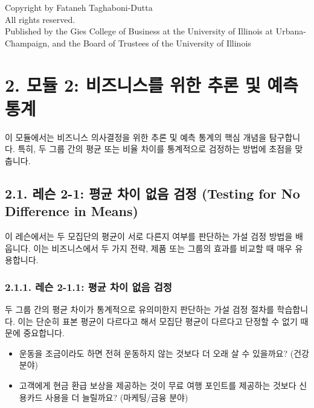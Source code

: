 \documentclass[11pt,a4paper]{article}
\begin{document}
\begin{tcolorbox}[mybox, title=저작권 정보]
Copyright  by Fataneh Taghaboni-Dutta \\
All rights reserved. \\
Published by the Gies College of Business at the University of Illinois at Urbana-Champaign, and the Board of Trustees of the University of Illinois
\end{tcolorbox}

\newpage
\section*{2. 모듈 2: 비즈니스를 위한 추론 및 예측 통계}

이 모듈에서는 비즈니스 의사결정을 위한 추론 및 예측 통계의 핵심 개념을 탐구합니다. 특히, 두 그룹 간의 평균 또는 비율 차이를 통계적으로 검정하는 방법에 초점을 맞춥니다.

\subsection*{2.1. 레슨 2-1: 평균 차이 없음 검정 (Testing for No Difference in Means)}

이 레슨에서는 두 모집단의 평균이 서로 다른지 여부를 판단하는 가설 검정 방법을 배웁니다. 이는 비즈니스에서 두 가지 전략, 제품 또는 그룹의 효과를 비교할 때 매우 유용합니다.

\subsubsection*{2.1.1. 레슨 2-1.1: 평균 차이 없음 검정}

\begin{summarybox}[title=핵심 요약: 두 평균의 차이 검정]
두 그룹 간의 평균 차이가 통계적으로 유의미한지 판단하는 가설 검정 절차를 학습합니다. 이는 단순히 표본 평균이 다르다고 해서 모집단 평균이 다르다고 단정할 수 없기 때문에 중요합니다.
\end{summarybox}

\begin{examplebox}[title=생각해 볼 질문: 실제 비즈니스에서의 차이]
\begin{itemize}
    \item 운동을 조금이라도 하면 전혀 운동하지 않는 것보다 더 오래 살 수 있을까요? (건강 분야)
    \item 고객에게 현금 환급 보상을 제공하는 것이 무료 여행 포인트를 제공하는 것보다 신용카드 사용을 더 늘릴까요? (마케팅/금융 분야)
\end{itemize}
\end{examplebox}
\end{document}
